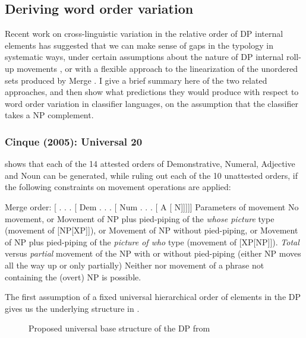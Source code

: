\documentclass[output=paper
,modfonts
,nonflat]{langsci/langscibook}
\begin{document}
\subsection{Deriving word order variation}

Recent work on cross-linguistic variation in the relative order of DP internal elements has suggested that we can make sense of gaps in the typology in systematic ways, under certain assumptions about the nature of DP internal roll-up movements \citep{Cinque1996,Cinque2005}, or with a flexible approach to the linearization of the unordered sets produced by Merge \citep{AbelsNeeleman2012}. I give a brief summary here of the two related approaches, and then show what predictions they would produce with respect to word order variation in classifier languages, on the assumption that the classifier takes a NP complement. 

\subsubsection{Cinque (2005): Universal 20}
\citet{Cinque2005} shows that each of the 14 attested orders of Demonstrative, Numeral, Adjective and Noun can be generated, while ruling out each of the 10 unattested orders, if the following constraints on movement operations are applied:

\ea \label{ex:hall:55}
\ea Merge order: [ . . . [ Dem . . . [ Num . . . [ A [ N]]]]]
\ex Parameters of movement
\ea No movement, or
\ex Movement of NP plus pied-piping of the \textit{whose picture} type (movement of [NP[XP]]), or  \label{ex:hall:55bii}
\ex Movement of NP without pied-piping, or \label{ex:hall:55biii}
\ex Movement of NP plus pied-piping of the \textit{picture of who} type (movement of [XP[NP]]). \label{ex:hall:55biv}
\ex \textit{Total} versus \textit{partial} movement of the NP with or without pied-piping (either NP moves all the way up or only partially)
\ex Neither  nor movement of a phrase not containing the (overt) NP is possible.
\z
\z
\z

The first assumption of a fixed universal hierarchical order of elements in the DP gives us the underlying structure in .

\begin{figure}
\caption{Proposed universal base structure of the DP from \citet{Cinque2005}\label{ex:hall:56}} %
\end{figure}
\end{document}
